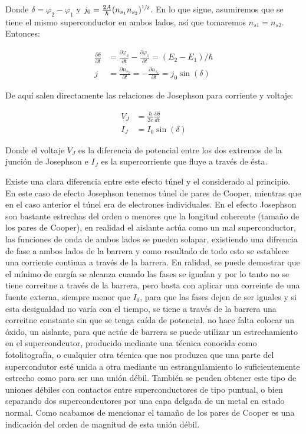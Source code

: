 Donde $\delta = \varphi_2 - \varphi_1$ y $j_0 = \frac{2 A}{\hbar} (n_{s_1} n_{s_2})^{\sfrac{1}{2}}$. En lo que sigue, asumiremos que se tiene el mismo superconductor en ambos lados, así que tomaremos $n_{s1} = n_{s2}$. Entonces:

\begin{align}
    \frac{\partial \delta}{\partial t} &= \frac{\partial \varphi_2}{\partial t} - \frac{\partial \varphi_1}{\partial t} = (E_2 - E_1)/\hbar \\
    j &= \frac{\partial n_{s_2}}{\partial t} = - \frac{\partial n_{s_1}}{\partial t} = j_0 \sin(\delta)
\end{align}

De aquí salen directamente las relaciones de Josephson para corriente y voltaje:

\begin{align}
    V_J &= \frac{\hbar}{2e} \frac{\partial \delta}{d t} \\
    I_J &= I_0 \sin(\delta)
\end{align}

Donde el voltaje $V_J$ es la diferencia de potencial entre los dos extremos de la junción de Josephson e $I_J$ es la supercorriente que fluye a través de ésta.

Existe una clara diferencia entre este efecto túnel y el considerado al principio. En este caso de efecto Josephson tenemos túnel de pares de Cooper, mientras que en el caso anterior el túnel era de electrones individuales. En el efecto Josephson son bastante estrechas del orden o menores que la longitud coherente (tamaño de los pares de Cooper), en realidad el aislante actúa como un mal superconductor, las funciones de onda de ambos lados se pueden solapar, existiendo una difrencia de fase a ambos lados de la barrera y como resultado de todo esto se establece una corriente continua a través de la barrera. En ralidad, se puede demostrar que el mínimo de enrgía se alcanza cuando las fases se igualan y por lo tanto no se tiene correitne a través de la barrera, pero basta con aplicar una correinte de una fuente externa, siempre menor que $I_0$, para que las fases dejen de ser iguales y si esta desigualdad no varía con el tiempo, se tiene a través de la barrera una correitne constante sin que se tenga caída de potencial. no hace falta colocar un óxido, un aislante, para que actúe de barrera se puede utilizar un estrechamiento en el supercondcutor, producido mediante una técnica conocida como fotolitografía, o cualquier otra técnica que nos produzca que una parte del supercondutor esté unida a otra mediante un estrangulamiento lo suficientemente estrecho como para ser una unión débil. También se peuden obtener este tipo de uniones débiles con contactos entre superconductores de tipo puntual, o bien separando dos supercondcutores por una capa delgada de un metal en estado normal. Como acabamos de mencionar el tamaño de los pares de Cooper es una indicación del orden de magnitud de esta unión débil.

